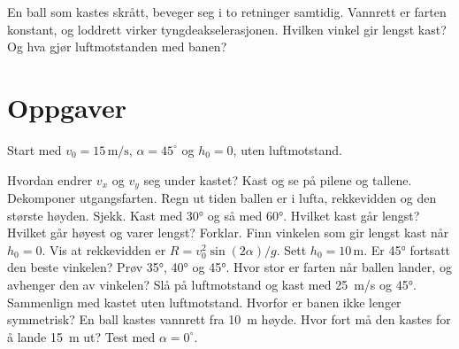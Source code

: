 \documentclass[11pt]{article}
\begin{document}

En ball som kastes skrått, beveger seg i to retninger samtidig. Vannrett er farten konstant, og loddrett virker tyngdeakselerasjonen. Hvilken vinkel gir lengst kast? Og hva gjør luftmotstanden med banen?

\section*{Oppgaver}

Start med $v_{0} = 15\,\mathrm{m/s}$, $α = 45^{\circ}$ og $h_{0} = 0$, uten luftmotstand.

\begin{oppgaveliste}
\oppgave {}Hvordan endrer $v_{x}$ og $v_{y}$ seg under kastet? Kast og se på pilene og tallene.
\svar
\oppgave {}Dekomponer utgangsfarten. Regn ut tiden ballen er i lufta, rekkevidden og den største høyden. Sjekk.
\svar
\oppgave {}Kast med 30° og så med 60°. Hvilket kast går lengst? Hvilket går høyest og varer lengst? Forklar.
\svar
\oppgave {}Finn vinkelen som gir lengst kast når $h_{0} = 0$. Vis at rekkevidden er $R = v_{0}^{2} \sin (2α) / g$.
\svar
\oppgave {}Sett $h_{0} = 10\,\mathrm{m}$. Er 45° fortsatt den beste vinkelen? Prøv 35°, 40° og 45°. Hvor stor er farten når ballen lander, og avhenger den av vinkelen?
\svar
\oppgave {}Slå på luftmotstand og kast med 25~m/s og 45°. Sammenlign med kastet uten luftmotstand. Hvorfor er banen ikke lenger symmetrisk?
\svar
\oppgave {}En ball kastes vannrett fra 10~m høyde. Hvor fort må den kastes for å lande 15~m ut? Test med $α = 0^{\circ}$.
\svar
\end{oppgaveliste}
\end{document}
